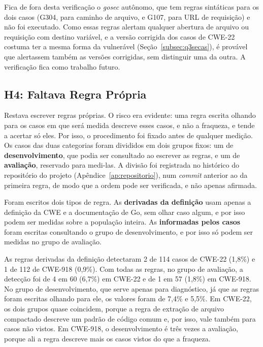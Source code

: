 Fica de fora desta verificação o \textit{gosec} autônomo, que tem regras sintáticas para os dois casos (G304, para caminho de arquivo, e G107, para URL de requisição) e não foi executado. Como essas regras alertam qualquer abertura de arquivo ou requisição com destino variável, e a versão corrigida dos casos de CWE-22 costuma ter a mesma forma da vulnerável (Seção~\ref{subsec:q3secas}), é provável que alertassem também as versões corrigidas, sem distinguir uma da outra. A verificação fica como trabalho futuro.

\subsection{H4: Faltava Regra Própria}
\label{subsec:h4}

Restava escrever regras próprias. O risco era evidente: uma regra escrita olhando para os casos em que será medida descreve esses casos, e não a fraqueza, e tende a acertar só eles. Por isso, o procedimento foi fixado antes de qualquer medição. Os casos das duas categorias foram divididos em dois grupos fixos: um de \textbf{desenvolvimento}, que podia ser consultado ao escrever as regras, e um de \textbf{avaliação}, reservado para medi-las. A divisão foi registrada no histórico do repositório do projeto (Apêndice~\ref{ap:repositorio}), num \textit{commit} anterior ao da primeira regra, de modo que a ordem pode ser verificada, e não apenas afirmada.

Foram escritos dois tipos de regra. As \textbf{derivadas da definição} usam apenas a definição da CWE e a documentação de Go, sem olhar caso algum, e por isso podem ser medidas sobre a população inteira. As \textbf{informadas pelos casos} foram escritas consultando o grupo de desenvolvimento, e por isso só podem ser medidas no grupo de avaliação.

As regras derivadas da definição detectaram 2 de 114 casos de CWE-22 (1,8\%) e 1 de 112 de CWE-918 (0,9\%). Com todas as regras, no grupo de avaliação, a detecção foi de 4 em 60 (6,7\%) em CWE-22 e de 1 em 57 (1,8\%) em CWE-918. No grupo de desenvolvimento, que serve apenas para diagnóstico, já que as regras foram escritas olhando para ele, os valores foram de 7,4\% e 5,5\%. Em CWE-22, os dois grupos quase coincidem, porque a regra de extração de arquivo compactado descreve um padrão de código comum e, por isso, vale também para casos não vistos. Em CWE-918, o desenvolvimento é três vezes a avaliação, porque ali a regra descreve mais os casos vistos do que a fraqueza.

